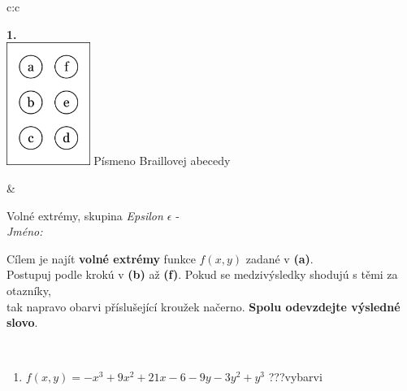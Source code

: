 \documentclass[10pt]{report}
\begin{document}
\begin{tabular}{c:c}
\begin{minipage}[c][104.5mm][t]{0.5\linewidth}
\begin{center}
\begin{minipage}{0.79\linewidth}
\begin{center}
\begin{varwidth}{\linewidth}
\begin{enumerate}
\end{enumerate}
\end{varwidth}
\end{center}
\end{minipage}
\begin{minipage}{0.20\linewidth}
\begin{center}
{\Huge\bfseries 1.} \\[2mm]
\includegraphics[height=40mm]{../images/braille.png}
{\small Písmeno Braillovej abecedy}
\end{center}
\end{minipage}
\end{center}
\end{minipage}
&
\begin{minipage}[c][104.5mm][t]{0.5\linewidth}
\begin{center}
\vspace{7mm}
{\huge Volné extrémy, skupina \textit{Epsilon $\epsilon$} -}\\[5mm]
\textit{Jméno:}\phantom{xxxxxxxxxxxxxxxxxxxxxxxxxxxxxxxxxxxxxxxxxxxxxxxxxxxxxxxxxxxxxxxxx}\\[5mm]
\begin{minipage}{0.95\linewidth}
\begin{center}
Cílem je najít \textbf{volné extrémy} funkce $f(x,y)$ zadané v \textbf{(a)}.\\Postupuj podle krokú v \textbf{(b)} až \textbf{(f)}. Pokud se medzivýsledky shodujú s těmi za otazníky,\\tak napravo obarvi příslušející kroužek načerno. \textbf{Spolu odevzdejte výsledné slovo}.
\end{center}
\end{minipage}
\\[1mm]
\begin{minipage}{0.79\linewidth}
\begin{center}
\begin{varwidth}{\linewidth}
\begin{enumerate}
\normalsize
\item $f(x,y)=-x^3+9x^2+21x-6-9y-3y^2+y^3$\quad \dotfill\; ???\;\dotfill \quad vybarvi

\end{enumerate}
\end{varwidth}
\end{center}
\end{minipage}
\end{center}
\end{minipage}
\end{tabular}
\end{document}

